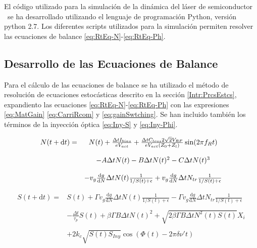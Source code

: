 El c\'odigo utilizado para la simulaci\'on de la din\'amica del l\'aser de semiconductor \gs\ se ha desarrollado utilizando el lenguaje de programaci\'on Python, versi\'on python 2.7. Los diferentes scripts utilizados para la simulaci\'on \cite{github} permiten resolver las ecuaciones de balance \ref{eq:RtEq-N}-\ref{eq:RtEq-Ph}.


	\subsection{Desarrollo de las Ecuaciones de Balance}
		\label{Mdl:Code:RtEq}

		Para el c\'alculo de las ecuaciones de balance se ha utilizado el m\'etodo de resoluci\'on de ecuaciones estoc\'asticas descrito en la secci\'on \ref{Intr:PrcsEstcs}, expandiento las ecuaciones \ref{eq:RtEq-N}-\ref{eq:RtEq-Ph} con las expresiones  \ref{eq:MatGain} \ref{eq:CarriRcom} y \ref{eq:gainSwtching}. Se han incluido tambi\'en los t\'erminos de la inyecci\'on \'optica \ref{eq:Iny-S} y \ref{eq:Iny-Phi}.

			\begin{equation}
				\begin{matrix}
					N(t + \mathrm{d}t) =  & N(t) + \frac{\Delta t I_{bias} }{e V_{act}} + \frac{\Delta t C_{loss} 2 \sqrt{2} V_{RF}}{eV_{act} (Z_0+Z_l)} \sin(2\pi f_R t) \\ \\
					& - A\Delta t N(t) - B\Delta t N(t)^2 - C\Delta t N(t)^3 \\ \\
					& - v_g \frac{\mathrm{d}g}{\mathrm{d}N} \Delta t N(t) \frac{1}{1/S(t) + \epsilon}  + v_g \frac{\mathrm{d}g}{\mathrm{d}N} \Delta t N_{tr} \frac{1}{1/S(t) + \epsilon}
				\end{matrix}
				\label{eq:Code-N}
			\end{equation}

			\begin{equation}
				\begin{matrix}
					S(t + \mathrm{d}t) =  & S(t) + \Gamma v_g \frac{\mathrm{d}g}{\mathrm{d}N} \Delta t N(t) \frac{1}{1/S(t) + \epsilon} - \Gamma v_g \frac{\mathrm{d}g}{\mathrm{d}N} \Delta t N_{tr} \frac{1}{1/S(t) + \epsilon} \\ \\
					& - \frac{\Delta t}{\tau_p}S(t) + \beta\Gamma B\Delta t N(t)^2 + \sqrt{2 \beta \Gamma B \Delta tN^2(t)S(t)} X_i \\ \\
					& + 2k_c\sqrt{S(t)S_{Iny}} \cos(\Phi(t) - 2\pi \delta\nu't)
				\end{matrix}
				\label{eq:Code-S}
			\end{equation}

